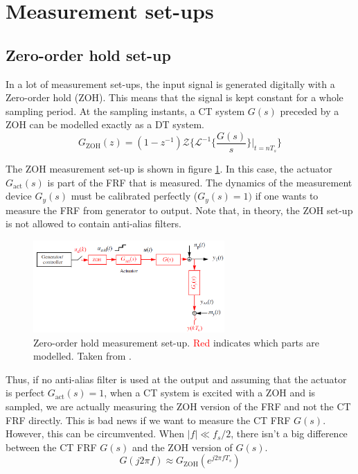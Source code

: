 \newpage
\section{Measurement set-ups}
\subsection{Zero-order hold set-up}
In a lot of measurement set-ups, the input signal is generated digitally with a Zero-order hold (ZOH). This means that the signal is kept constant for a whole sampling period. At the sampling instants, a CT system $G(s)$ preceded by a ZOH can be modelled exactly as a DT system. \cite[eq. (34)]{ZOH_reference}
\begin{equation}
    G_{\mathrm{ZOH}}(z) = (1-z^{-1})  \mathcal{Z}\Big\{\mathcal{L}^{-1}\big\{\frac{G(s)}{s} \big\}\rvert_{t=n T_s}\Big\}
    \label{eq:ZOH_transform}
\end{equation}

The ZOH measurement set-up is shown in figure \ref{fig:zoh_setup}. In this case, the actuator $G_\mathrm{act}(s)$ is part of the FRF that is measured. The dynamics of the measurement device $G_y(s)$ must be calibrated perfectly ($G_y(s)=1)$ if one wants to measure the FRF from generator to output. Note that, in theory, the ZOH set-up is not allowed to contain anti-alias filters.
\begin{figure}[H]
    \centering
    \includegraphics[width =0.65\textwidth]{figures/ZOH_setup.png}
    \caption{Zero-order hold measurement set-up. \textcolor{red}{Red} indicates which parts are modelled. Taken from \cite{identification_of_dynamical_sytems_slides}.}
    \label{fig:zoh_setup}
\end{figure}
Thus, if no anti-alias filter is used at the output and assuming that the actuator is perfect $G_{\textrm{act}}(s)=1$, when a CT system is excited with a ZOH and is sampled, we are actually measuring the ZOH version of the FRF and not the CT FRF directly. This is bad news if we want to measure the CT FRF $G(s)$. However, this can be circumvented. When $|f| \ll f_s/2$, there isn't a big difference between the CT FRF $G(s)$ and the ZOH version of $G(s)$.
\begin{equation}
    G(j 2 \pi f) \approx G_{\mathrm{ZOH}}(e^{j 2 \pi f T_s})
    \label{eq:Gzohapprox}
\end{equation}

